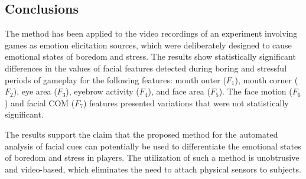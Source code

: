 \subsection{Conclusions}

The method has been applied to the video recordings of an experiment involving games as emotion elicitation sources, which were deliberately designed to cause emotional states of boredom and stress. The results show statistically significant differences in the values of facial features detected during boring and stressful periods of gameplay for the following features: mouth outer ($F_1$), mouth corner ($F_2$), eye area ($F_3$), eyebrow activity ($F_4$), and face area ($F_5$). The face motion ($F_6$) and facial COM ($F_7$) features presented variations that were not statistically significant.

The results support the claim that the proposed method for the automated analysis of facial cues can potentially be used to differentiate the emotional states of boredom and stress in players. The utilization of such a method is unobtrusive and video-based, which eliminates the need to attach physical sensors to subjects.
